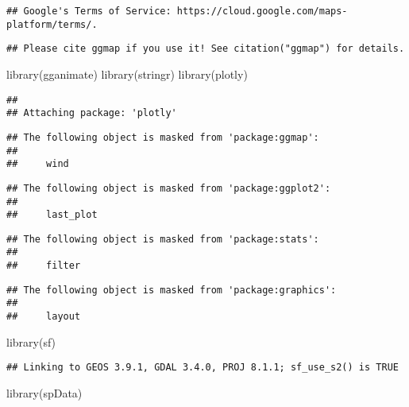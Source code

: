 \documentclass[]{tufte-handout}
\newenvironment{Shaded}{}{}
\newcommand{\FunctionTok}[1]{\textcolor[rgb]{0.02,0.16,0.49}{#1}}
\newcommand{\NormalTok}[1]{#1}
\begin{document}
\begin{verbatim}
## Google's Terms of Service: https://cloud.google.com/maps-platform/terms/.
\end{verbatim}

\begin{verbatim}
## Please cite ggmap if you use it! See citation("ggmap") for details.
\end{verbatim}

\begin{Shaded}
\begin{Highlighting}[]
\FunctionTok{library}\NormalTok{(gganimate)}
\FunctionTok{library}\NormalTok{(stringr)}
\FunctionTok{library}\NormalTok{(plotly)}
\end{Highlighting}
\end{Shaded}

\begin{verbatim}
## 
## Attaching package: 'plotly'
\end{verbatim}

\begin{verbatim}
## The following object is masked from 'package:ggmap':
## 
##     wind
\end{verbatim}

\begin{verbatim}
## The following object is masked from 'package:ggplot2':
## 
##     last_plot
\end{verbatim}

\begin{verbatim}
## The following object is masked from 'package:stats':
## 
##     filter
\end{verbatim}

\begin{verbatim}
## The following object is masked from 'package:graphics':
## 
##     layout
\end{verbatim}

\begin{Shaded}
\begin{Highlighting}[]
\FunctionTok{library}\NormalTok{(sf)}
\end{Highlighting}
\end{Shaded}

\begin{verbatim}
## Linking to GEOS 3.9.1, GDAL 3.4.0, PROJ 8.1.1; sf_use_s2() is TRUE
\end{verbatim}

\begin{Shaded}
\begin{Highlighting}[]
\FunctionTok{library}\NormalTok{(spData)}
\end{Highlighting}
\end{Shaded}
\end{document}
